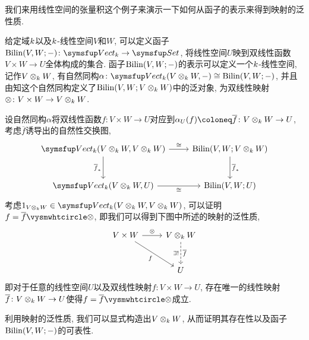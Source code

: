 \begin{example}
  我们来用线性空间的张量积这个例子来演示一下如何从函子的表示来得到映射的泛性质\footnotemark.

  给定域$k$以及$k$-线性空间$V$和$W$, 可以定义函子$\Bilin (V, W; -)\colon\cat{Vect}_{\kk}\to\cat{Set}$, 将线性空间$U$映到双线性函数$V\times W\to U$全体构成的集合. 函子$\operatorname{Bilin} (V, W; -)$的表示可以定义一个$k$-线性空间, 记作$V\otimes_{k}W$, 有自然同构$\alpha\colon\cat{Vect}_{\kk}(V\otimes_{\kk}W, -)\cong \Bilin (V, W; -)$, 并且由知这个自然同构定义了$\operatorname{Bilin} (V, W; V\otimes_{k} W)$中的泛对象, 为双线性映射$\otimes\colon V\times W\to V\otimes_{k} W$.

  设自然同构$\alpha$将双线性函数$f\colon V\times W\to U$对应到$\alpha_{U}(f)\coloneq\overline{f}\colon V\otimes_{\kk}W\to U$, 考虑$\overline{f}$诱导出的自然性交换图,
  \begin{equation*}
    \begin{tikzcd}[row sep=large]
      \cat{Vect}_{\kk}(V\otimes_{\kk}W, V\otimes_{\kk}W) \arrow[r, "\cong"{above}] \arrow[d, "\overline{f}_*"{left}] & \Bilin (V, W; V\otimes_{\kk}W) \arrow[d, "\overline{f}_*"{right}] \\
      \cat{Vect}_{\kk}(V\otimes_{\kk}W, U) \arrow[r, "\cong"{below}] & \Bilin (V, W; U)
    \end{tikzcd}
  \end{equation*}
  考虑$1_{V\otimes_{\kk}W}\in \cat{Vect}_{\kk}(V\otimes_{\kk}W, V\otimes_{\kk}W)$, 可以证明$f=\overline{f}\composite\otimes$, 即我们可以得到下图中所述的映射的泛性质,
  \begin{equation*}
    \begin{tikzcd}[row sep=large]
      V\times W & V\otimes_{\kk} W\\
      & U
      \arrow[from=1-1,]{2-2}[swap]{f}
      \arrow[from=1-1,]{1-2}[]{\otimes}
      \arrow[from=1-2,dashed,]{2-2}[]{\overline{f}}[swap]{\exists !}
    \end{tikzcd}
  \end{equation*}
  即对于任意的线性空间$U$以及双线性映射$f\colon V\times W\to U$, 存在唯一的线性映射$\overline{f}\colon V\otimes_{k}W\to U$使得$f=\overline{f}\composite\otimes$成立.

  利用映射的泛性质, 我们可以显式构造出$V\otimes_{k} W$, 从而证明其存在性以及函子$\operatorname{Bilin} (V, W; -)$的可表性.
\end{example}

